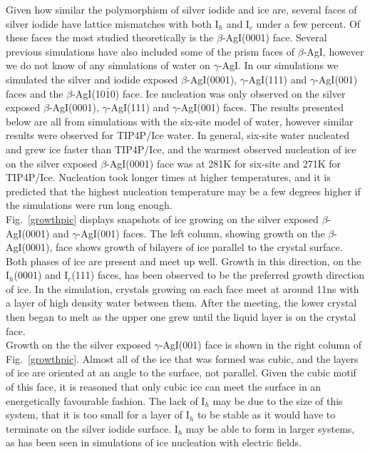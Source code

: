 \documentclass[titlepage]{article}
\begin{document}
\indent Given how similar the polymorphism of silver iodide and ice are, several faces of silver iodide have lattice mismatches with both I$_{h}$ and I$_{c}$ under a few percent.  Of these faces the most studied theoretically is the $\beta$-AgI(0001) face\cite{TH93, S05}.  Several previous simulations have also included some of the prism faces of $\beta$-AgI, however we do not know of any simulations of water on $\gamma$-AgI.  In our simulations we simulated the silver and iodide exposed $\beta$-AgI(0001), $\gamma$-AgI(111) and $\gamma$-AgI(001) faces and the $\beta$-AgI(10$\bar{1}$0) face.  Ice nucleation was only observed on the silver exposed $\beta$-AgI(0001), $\gamma$-AgI(111) and $\gamma$-AgI(001) faces.  The results presented below are all from simulations with the six-site model of water, however similar results were observed for TIP4P/Ice water.  In general, six-site water nucleated and grew ice faster than TIP4P/Ice, and the warmest observed nucleation of ice on the silver exposed $\beta$-AgI(0001) face was at 281K for six-site and 271K for TIP4P/Ice.  Nucleation took longer times at higher temperatures, and it is predicted that the highest nucleation temperature may be a few degrees higher if the simulations were run long enough.\\
\indent Fig.~\ref{growthpic} displays snapshots of ice growing on the silver exposed $\beta$-AgI(0001) and $\gamma$-AgI(001) faces.  The left column, showing growth on the $\beta$-AgI(0001), face shows growth of bilayers of ice parallel to the crystal surface.  Both phases of ice are present and meet up well\cite{J98}.  Growth in this direction, on the I$_{h}$(0001) and I$_{c}$(111) faces, has been observed to be the preferred growth direction of ice\cite{C07}.  In the simulation, crystals growing on each face meet at around 11ns with a layer of high density water between them.  After the meeting, the lower crystal then began to melt as the upper one grew until the liquid layer is on the crystal face.\\
\indent Growth on the the silver exposed $\gamma$-AgI(001) face is shown in the right column of Fig.~\ref{growthpic}.  Almost all of the ice that was formed was cubic, and the layers of ice are oriented at an angle to the surface, not parallel.  Given the cubic motif of this face, it is reasoned that only cubic ice can meet the surface in an energetically favourable fashion.  The lack of I$_{h}$ may be due to the size of this system, that it is too small for a layer of I$_{h}$ to be stable as it would have to terminate on the silver iodide surface.  I$_{h}$ may be able to form in larger systems, as has been seen in simulations of ice nucleation with electric fields\cite{YP13}.
\end{document}
